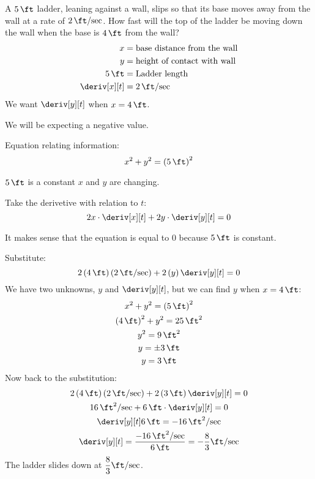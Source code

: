 \begin{example}
    A $\SI{5}{\ft}$ ladder, leaning against a wall, slips so that its base moves away from the wall at a rate of $\SI{2}{\ft\per\sec}$. How fast will the top of the ladder be moving down the wall when the base is $\SI{4}{\ft}$ from the wall?
    \begin{align*}
        x &= \text{base distance from the wall} \\
        y &= \text{height of contact with wall} \\
        \SI{5}{\ft} &= \text{Ladder length} \\
        \deriv[x][t] &= \SI{2}{\ft\per\sec}
    \end{align*}
    We want $\deriv[y][t]$ when $x = \SI{4}{\ft}$.
    \begin{note}
        We will be expecting a negative value.
    \end{note}
    Equation relating information:
    \begin{equation*}
        x^2 + y^2 = \left(\SI{5}{\ft}\right)^2
    \end{equation*}
    \begin{note}
        $\SI{5}{\ft}$ is a constant $x$ and $y$ are changing.
    \end{note}
    Take the derivetive with relation to $t$:
    \begin{equation*}
        2x \cdot \deriv[x][t] + 2y \cdot \deriv[y][t] = 0
    \end{equation*}
    \begin{note}
        It makes sense that the equation is equal to $0$ because $\SI{5}{\ft}$ is constant.
    \end{note}
    Substitute:
    \begin{equation*}
        2\left(\SI{4}{\ft}\right)\left(\SI{2}{\ft\per\sec}\right) + 2\left(y\right)\deriv[y][t] = 0
    \end{equation*}
    We have two unknowns, $y$ and $\deriv[y][t]$, but we can find $y$ when $x = \SI{4}{\ft}$:
    \begin{gather*}
        x^2 + y^2 = \left(\SI{5}{\ft}\right)^2 \\
        \left(\SI{4}{\ft}\right)^2 + y^2 = \SI{25}{\ft\squared} \\
        y^2 = \SI{9}{\ft\squared} \\
        y = \pm \SI{3}{\ft} \\
        y = \SI{3}{\ft}
    \end{gather*}
    Now back to the substitution:
    \begin{gather*}
        2\left(\SI{4}{\ft}\right)\left(\SI{2}{\ft\per\sec}\right) + 2\left(\SI{3}{\ft}\right)\deriv[y][t] = 0 \\
        \SI{16}{\ft\squared\per\sec} + \SI{6}{\ft} \cdot \deriv[y][t] = 0 \\
        \deriv[y][t]\SI{6}{\ft} = \SI{-16}{\ft\squared\per\sec} \\
        \deriv[y][t] = \dfrac{\SI{-16}{\ft\squared\per\sec}}{\SI{6}{\ft}} = -\dfrac{8}{3}\si{\ft\per\sec}
    \end{gather*}
    The ladder slides down at $\dfrac{8}{3}\si{\ft\per\sec}$.
\end{example}
